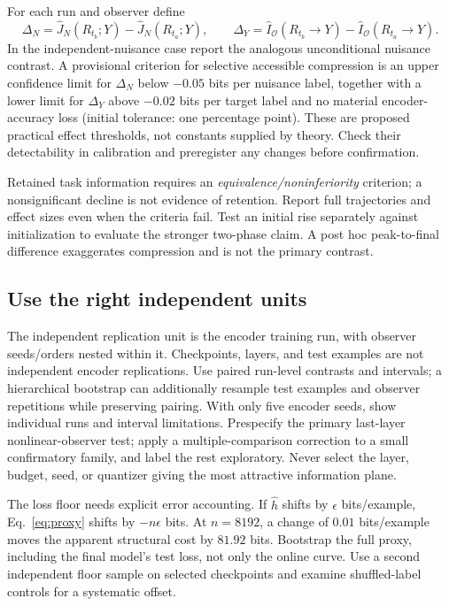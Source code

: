 \documentclass[11pt,a4paper]{article}
\begin{document}
For each run and observer define
\[
\Delta_N=\widehat J_N(R_{t_b};Y)-\widehat J_N(R_{t_a};Y),\qquad
\Delta_Y=\widehat I_{\mathcal O}(R_{t_b}\to Y)-\widehat I_{\mathcal O}(R_{t_a}\to Y).
\]
In the independent-nuisance case report the analogous unconditional nuisance contrast. A provisional criterion for selective accessible compression is an upper confidence limit for $\Delta_N$ below $-0.05$ bits per nuisance label, together with a lower limit for $\Delta_Y$ above $-0.02$ bits per target label and no material encoder-accuracy loss (initial tolerance: one percentage point). These are proposed practical effect thresholds, not constants supplied by theory. Check their detectability in calibration and preregister any changes before confirmation.

Retained task information requires an \emph{equivalence/noninferiority} criterion; a nonsignificant decline is not evidence of retention. Report full trajectories and effect sizes even when the criteria fail. Test an initial rise separately against initialization to evaluate the stronger two-phase claim. A post hoc peak-to-final difference exaggerates compression and is not the primary contrast.

\subsection{Use the right independent units}
The independent replication unit is the encoder training run, with observer seeds/orders nested within it. Checkpoints, layers, and test examples are not independent encoder replications. Use paired run-level contrasts and intervals; a hierarchical bootstrap can additionally resample test examples and observer repetitions while preserving pairing. With only five encoder seeds, show individual runs and interval limitations. Prespecify the primary last-layer nonlinear-observer test; apply a multiple-comparison correction to a small confirmatory family, and label the rest exploratory. Never select the layer, budget, seed, or quantizer giving the most attractive information plane.

The loss floor needs explicit error accounting. If $\widehat h$ shifts by $\epsilon$ bits/example, Eq.~\eqref{eq:proxy} shifts by $-n\epsilon$ bits. At $n=8192$, a change of $0.01$ bits/example moves the apparent structural cost by $81.92$ bits. Bootstrap the full proxy, including the final model's test loss, not only the online curve. Use a second independent floor sample on selected checkpoints and examine shuffled-label controls for a systematic offset.
\end{document}
